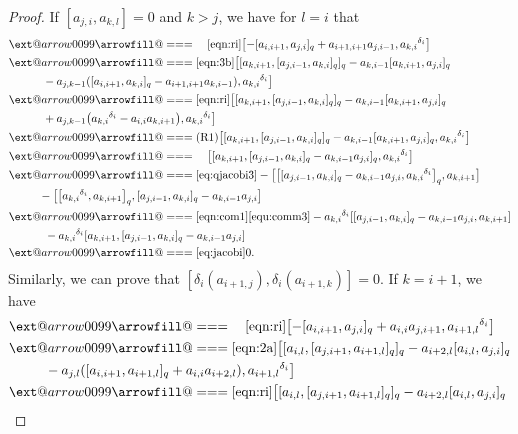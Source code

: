 \documentclass[10pt,a4paper]{amsart}
\makeatletter
\def\x@arrow{\DOTSB\Relbar}
\def\xlongequalsignfill@{\arrowfill@\x@arrow\Relbar\x@arrow}
\providecommand{\xlongequal}[2][]{%
	\ext@arrow 0099\xlongequalsignfill@{#1}{#2}}
\numberwithin{equation}{section}
\def\lr#1{\left[#1\right]}
\def\d{\delta}
\makeatother
\begin{document}
\begin{proof}
If $\lr{a_{j,i}, a_{k,l}}=0$ and $k>j$, we have for $l=i$ that
 \begin{align*}
 [\d_i (a_{j,i}), \d_i(a_{k,i} ) ] &
 \xlongequal[\quad]{\eqref{eqn:ri}} \bigl[- [a_{i,i+1}, a_{j,i} ]_q+a_{i+1,i+1}a_{j,i-1}, {a_{k,i}}^{\d_i} \bigr] \\
 &\xlongequal{\eqref{eqn:3b}} \bigl[ [a_{k,i+1}, [a_{j,i-1}, a_{k,i} ]_q ]_q -a_{k,i-1} [a_{k,i+1}, a_{j,i} ]_q \\
 &\qquad \quad -a_{j,k-1} ( [a_{i,i+1}, a_{k,i} ]_q-a_{i+1,i+1}a_{k,i-1} ) , {a_{k,i}}^{\d_i} \bigr]\\
& \xlongequal{\eqref{eqn:ri}} \bigl[ [a_{k,i+1}, [a_{j,i-1}, a_{k,i} ]_q ]_q-a_{k,i-1} [a_{k,i+1}, a_{j,i} ]_q \\
 &\qquad \quad +a_{j,k-1} \bigl({a_{k,i}}^{\d_i}-a_{i,i}a_{k,i+1} \bigr) , {a_{k,i}}^{\d_i} \bigr] \\
 &\xlongequal{(\textrm{R1})} \bigl[ [a_{k,i+1}, [a_{j,i-1}, a_{k,i} ]_q ]_q-a_{k,i-1} [a_{k,i+1}, a_{j,i} ]_q, {a_{k,i}}^{\d_i} \bigr] \\
 & \xlongequal{\quad} \bigl[ [a_{k,i+1}, [a_{j,i-1}, a_{k,i} ]_q-a_{k,i-1}a_{j,i} ]_q, {a_{k,i}}^{\d_i} \bigr] \\
 &\xlongequal{\eqref{eq:qjacobi3}} - \bigl[ \bigl[ [a_{j,i-1}, a_{k,i} ]_q- a_{k,i-1}a_{j,i}, {a_{k,i}}^{\d_i} \bigr]_q, a_{k,i+1} \bigr] \\
 &\qquad\ \ - \bigl[ \bigl[{a_{k,i}}^{\d_i}, a_{k,i+1} \bigr]_q, [a_{j,i-1}, a_{k,i} ]_q-a_{k,i-1}a_{j,i} \bigr] \\
 &\xlongequal[\eqref{eqn:com1}]{\eqref{equ:comm3}} -{a_{k,i}}^{\d_i} [ [a_{j,i-1}, a_{k,i} ]_q-a_{k,i-1}a_{j,i}, a_{k,i+1} ] \\
 &\qquad\quad \, -{a_{k,i}}^{\d_i} [a_{k,i+1}, [a_{j,i-1}, a_{k,i} ]_q-a_{k,i-1}a_{j,i} ] \\
 &\xlongequal{\eqref{eq:jacobi}} 0.
 \end{align*}
Similarly, we can prove that
$[\d_i(a_{i+1,j}), \d_i(a_{i+1,k}) ]=0$.
If $k=i+1$, we have
 \begin{align*}
 [\d_i(a_{j,i}), \d_i(a_{i+1, l}) ]&
 \xlongequal[\quad]{\eqref{eqn:ri}} \bigl[- [a_{i,i+1}, a_{j,i} ]_q+a_{i,i}a_{j,i+1}, {a_{i+1,l}}^{\d_i} \bigr]\\
 &\xlongequal{\eqref{eqn:2a}} \bigl[ [a_{i,l}, [a_{j,i+1}, a_{i+1,l} ]_q ]_q-a_{i+2,l} [a_{i,l}, a_{j,i} ]_q \\
 &\qquad\ \ -a_{j,l} ( [a_{i,i+1}, a_{i+1,l} ]_q+a_{i,i}a_{i+2,l} ), {a_{i+1,l}}^{\d_i} \bigr] \\
 &\xlongequal{\eqref{eqn:ri}} \bigl[ [a_{i,l}, [a_{j,i+1}, a_{i+1,l} ]_q ]_q-a_{i+2,l} [a_{i,l}, a_{j,i} ]_q\\

\end{align*}
\end{proof}
\end{document}
